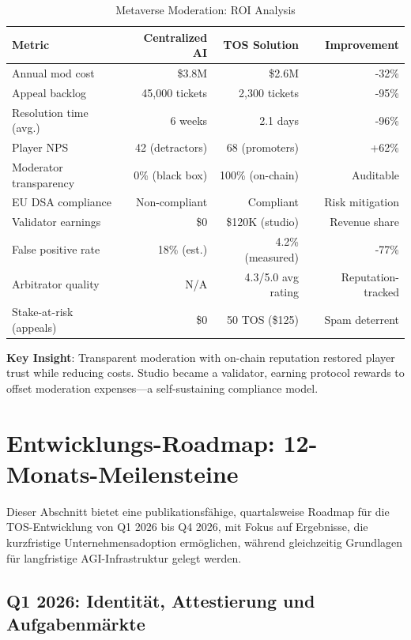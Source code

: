\documentclass[11pt]{article}
\begin{document}
\begin{table}[H]
\centering
\caption{Metaverse Moderation: ROI Analysis}
\label{tab:metaverse-roi}
\begin{tabular}{@{}lrrr@{}}
\toprule
\textbf{Metric} & \textbf{Centralized AI} & \textbf{TOS Solution} & \textbf{Improvement} \\ \midrule
Annual mod cost & \$3.8M & \$2.6M & -32\% \\
Appeal backlog & 45,000 tickets & 2,300 tickets & -95\% \\
Resolution time (avg.) & 6 weeks & 2.1 days & -96\% \\
Player NPS & 42 (detractors) & 68 (promoters) & +62\% \\
Moderator transparency & 0\% (black box) & 100\% (on-chain) & Auditable \\
EU DSA compliance & Non-compliant & Compliant & Risk mitigation \\
Validator earnings & \$0 & \$120K (studio) & Revenue share \\
False positive rate & 18\% (est.) & 4.2\% (measured) & -77\% \\
Arbitrator quality & N/A & 4.3/5.0 avg rating & Reputation-tracked \\
Stake-at-risk (appeals) & \$0 & 50 TOS (\$125) & Spam deterrent \\
\bottomrule
\end{tabular}
\end{table}

\textbf{Key Insight}: Transparent moderation with on-chain reputation restored player trust while reducing costs. Studio became a validator, earning protocol rewards to offset moderation expenses—a self-sustaining compliance model.

\section{Entwicklungs-Roadmap: 12-Monats-Meilensteine}
\label{sec:12month-roadmap}

Dieser Abschnitt bietet eine publikationsfähige, quartalsweise Roadmap für die TOS-Entwicklung von Q1 2026 bis Q4 2026, mit Fokus auf Ergebnisse, die kurzfristige Unternehmensadoption ermöglichen, während gleichzeitig Grundlagen für langfristige AGI-Infrastruktur gelegt werden.

\subsection{Q1 2026: Identität, Attestierung und Aufgabenmärkte}
\end{document}
